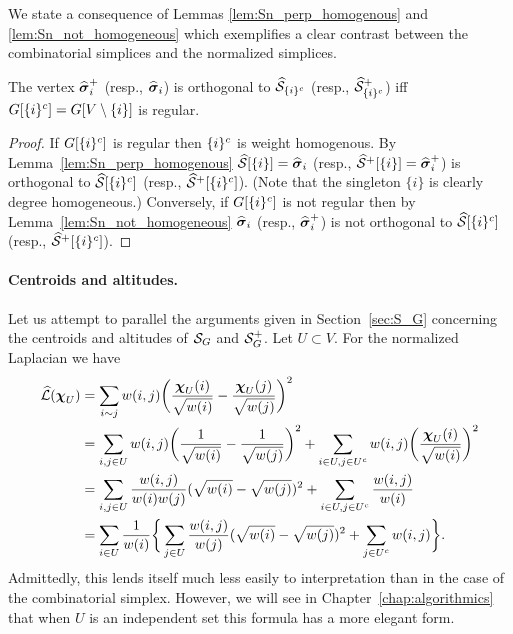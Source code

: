 We state a consequence of Lemmas \ref{lem:Sn_perp_homogenous} and \ref{lem:Sn_not_homogeneous} which exemplifies a clear contrast between  the combinatorial simplices and the normalized simplices.   

\begin{corollary}
	\label{cor:Sn_orthog_iff_regular}
	The vertex $\widehat{\vb*{\sigma}}_i^+$ (resp., $\widehat{\vb*{\sigma}}_i$) is orthogonal to $\widehat{\mathcal{S}}_{\{i\}^c}$ (resp., $\widehat{\mathcal{S}}^+_{\{i\}^c}$) iff $G[{\{i\}^c}]=G[V\setminus\{i\}]$ is regular. 
\end{corollary}
\begin{proof}
	If $G[{\{i\}^c}]$ is regular then ${\{i\}^c}$ is weight homogenous. By Lemma~\ref{lem:Sn_perp_homogenous} $\widehat{\mathcal{S}}[\{i\}]=\widehat{\vb*{\sigma}}_i$ (resp., $\widehat{\mathcal{S}}^+[\{i\}]=\widehat{\vb*{\sigma}}_i^+$) is orthogonal to $\widehat{\mathcal{S}}[{\{i\}^c}]$ (resp., $\widehat{\mathcal{S}}^+[{\{i\}^c}]$). (Note that the singleton $\{i\}$ is clearly degree homogeneous.) Conversely, if $G[{\{i\}^c}]$ is not regular then by Lemma~\ref{lem:Sn_not_homogeneous} $\widehat{\vb*{\sigma}}_i$ (resp., $\widehat{\vb*{\sigma}}_i^+$) is not orthogonal to $\widehat{\mathcal{S}}[{\{i\}^c}]$ (resp., $\widehat{\mathcal{S}}^+[{\{i\}^c}]$).
\end{proof}

\paragraph{Centroids and altitudes.}
Let us attempt to parallel the arguments given in Section~\ref{sec:S_G}  concerning the centroids and altitudes of $\mathcal{S}_G$ and $\mathcal{S}_G^+$. Let  $U\subset  V$. For the normalized Laplacian we have
\begin{align}
\widehat{\mathcal{L}}(\boldsymbol{\chi}_U)&=\sum_{i\sim j}w(i,j) \bigg(\frac{\boldsymbol{\chi}_U(i)}{\sqrt{w(i)}}-\frac{\boldsymbol{\chi}_U(j)}{\sqrt{w(j)}}\bigg)^2 \notag \\
&= \sum_{i,j\in U}w(i,j)\bigg(\frac{1}{\sqrt{w(i)}}-\frac{1}{\sqrt{w(j)}}\bigg)^2 + \sum_{i\in U,j\in U^c}w(i,j)\bigg(\frac{\boldsymbol{\chi}_U(i)}{\sqrt{w(i)}}\bigg)^2 \notag \\
&= \sum_{i,j\in  U}\frac{w(i,j)}{w(i)w(j)}(\sqrt{w(i)}-\sqrt{w(j)})^2+ \sum_{i\in U,j\in U^c}\frac{w(i,j)}{w(i)} \notag \\
&= \sum_{i\in U}\frac{1}{w(i)} \bigg\{\sum_{j\in U}\frac{w(i,j)}{w(j)}(\sqrt{w(i)}-\sqrt{w(j)})^2 + \sum_{j\in  U^c}w(i,j)\bigg\}. \label{eq:Lnf(chiU)}
\end{align}
Admittedly,  this lends itself much less easily  to interpretation than  in the  case of the  combinatorial simplex. However,  we  will see in Chapter~\ref{chap:algorithmics} that when  $U$ is an independent set this formula has  a more elegant form.  



